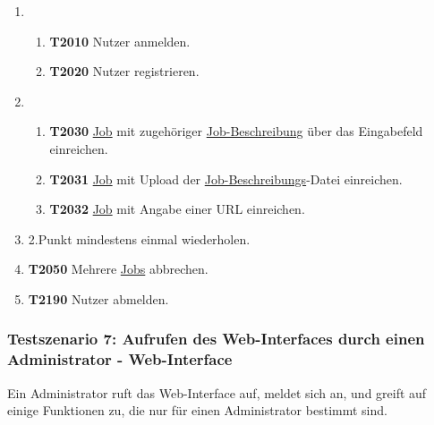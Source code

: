 \begin{enumerate}
     \item 
     \begin{enumerate}
        \item \textbf{T2010} \gls{Nutzer} anmelden.
        
        \item \textbf{T2020} \gls{Nutzer} registrieren.
     \end{enumerate}
     
     \item 
     \begin{enumerate}
        \item \textbf{T2030} \hyperref[B:Jobs]{Job} mit zugehöriger \hyperref[B:Job-Beschreibung]{Job-Beschreibung} über das Eingabefeld einreichen.
        
        \item \textbf{T2031} \hyperref[B:Jobs]{Job} mit Upload der \hyperref[B:Job-Beschreibung]{Job-Beschreibungs}-Datei einreichen.
        
        \item \textbf{T2032} \hyperref[B:Jobs]{Job} mit Angabe einer \gls{URL} einreichen.
     \end{enumerate}
     
     \item 2.Punkt mindestens einmal wiederholen.
     
     \item \textbf{T2050} Mehrere \hyperref[B:Jobs]{Jobs} abbrechen.
     
     \item \textbf{T2190} \gls{Nutzer} abmelden.
\end{enumerate}

\subsubsection{Testszenario 7: Aufrufen des Web-Interfaces durch einen Administrator - Web-Interface}
Ein \gls{Administrator} ruft das \gls{Web-Interface} auf, meldet sich an, und greift auf einige Funktionen zu, die nur für einen \gls{Administrator} bestimmt sind.

